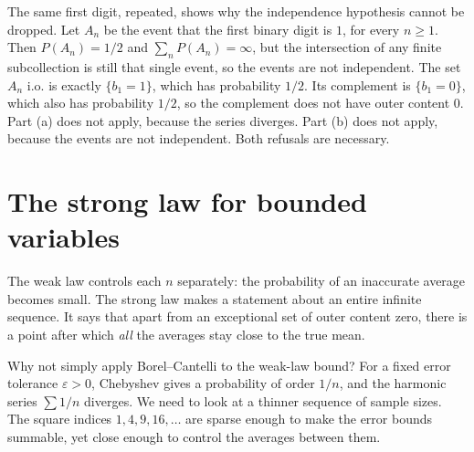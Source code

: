 The same first digit, repeated, shows why the independence hypothesis cannot be dropped. Let $A_n$ be the event that the first binary digit is $1$, for every $n\ge1$. Then $P(A_n)=1/2$ and $\sum_n P(A_n)=\infty$, but the intersection of any finite subcollection is still that single event, so the events are not independent. The set $A_n\text{ i.o.}$ is exactly $\{b_1=1\}$, which has probability $1/2$. Its complement is $\{b_1=0\}$, which also has probability $1/2$, so the complement does not have outer content $0$. Part (a) does not apply, because the series diverges. Part (b) does not apply, because the events are not independent. Both refusals are necessary.

\section{The strong law for bounded variables}

The weak law controls each $n$ separately: the probability of an inaccurate average becomes small. The strong law makes a statement about an entire infinite sequence. It says that apart from an exceptional set of outer content zero, there is a point after which \emph{all} the averages stay close to the true mean.

Why not simply apply Borel--Cantelli to the weak-law bound? For a fixed error tolerance $\varepsilon>0$, Chebyshev gives a probability of order $1/n$, and the harmonic series $\sum 1/n$ diverges. We need to look at a thinner sequence of sample sizes. The square indices $1,4,9,16,\ldots$ are sparse enough to make the error bounds summable, yet close enough to control the averages between them.

